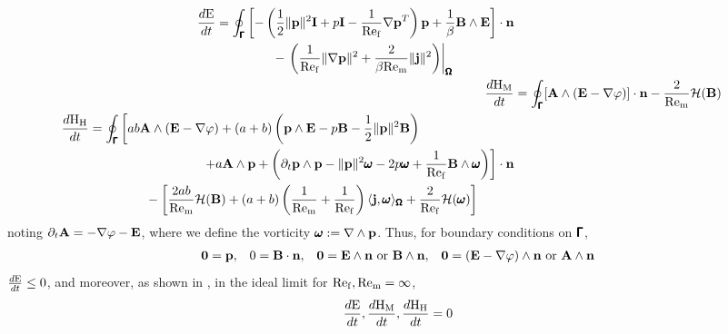     \begin{align}
        \begin{split}
            \frac{d\mathrm{E}}{dt}  &=  \oint_{\pmb{\mathsf{\Gamma}}}\left[- \left(\frac{1}{2}\|\mathbf{p}\|^{2}\mathbf{I} + p\mathbf{I} - \frac{1}{\mathrm{Re}_{\mathrm{f}}}\nabla\mathbf{p}^{T}\right)\mathbf{p} + \frac{1}{\beta}\mathbf{B}\wedge\mathbf{E}\right]\cdot\mathbf{n}  \\
            &\;\;\;\;\;\;\;\;\;\;\;\;\;\;\;\;- \left.\left(\frac{1}{\mathrm{Re}_{\mathrm{f}}}\|\nabla\mathbf{p}\|^{2} + \frac{2}{\beta\mathrm{Re}_{\mathrm{m}}}\|\mathbf{j}\|^{2}\right)\right|_{\pmb{\mathsf{\Omega}}}
        \end{split}  \\
        \frac{d\mathrm{H}_{\mathrm{M}}}{dt}  &=  \oint_{\pmb{\mathsf{\Gamma}}}[\mathbf{A}\wedge(\mathbf{E} - \nabla\varphi)]\cdot\mathbf{n} - \frac{2}{\mathrm{Re}_{\mathrm{m}}}\mathcal{H}(\mathbf{B})  \\
        \begin{split}
            \frac{d\mathrm{H}_{\mathrm{H}}}{dt}  &=  \oint_{\pmb{\mathsf{\Gamma}}}\left[ab\mathbf{A}\wedge(\mathbf{E} - \nabla\varphi) + (a + b)\left(\mathbf{p}\wedge\mathbf{E} - p\mathbf{B} - \frac{1}{2}\|\mathbf{p}\|^{2}\mathbf{B}\right)\right.  \\
            &\;\;\;\;\;\;\;\;\;\;\;\;\;\;\;\;\;\;\;\;\;\;\;\;\;\;\;\;\;\;\;\;\left.+ a\mathbf{A}\wedge\mathbf{p} + \left(\partial_{t}\mathbf{p}\wedge\mathbf{p} - \|\mathbf{p}\|^{2}\pmb{\mathsf{\omega}} - 2p\pmb{\mathsf{\omega}} + \frac{1}{\mathrm{Re}_{\mathrm{f}}}\mathbf{B}\wedge\pmb{\mathsf{\omega}}\right)\right]\cdot\mathbf{n}  \\
            &\;\;\;\;\;\;\;\;\;\;\;\;\;\;\;\;- \left[\frac{2ab}{\mathrm{Re}_{\mathrm{m}}}\mathcal{H}(\mathbf{B}) + (a + b)\left(\frac{1}{\mathrm{Re}_{\mathrm{m}}} + \frac{1}{\mathrm{Re}_{\mathrm{f}}}\right)\langle\mathbf{j}, \pmb{\mathsf{\omega}}\rangle_{\pmb{\mathsf{\Omega}}} + \frac{2}{\mathrm{Re}_{\mathrm{f}}}\mathcal{H}(\pmb{\mathsf{\omega}})\right]
        \end{split}
    \end{align}
    noting $\partial_{t}\mathbf{A}  =  - \nabla\varphi - \mathbf{E}$, where we define the vorticity $\pmb{\mathsf{\omega}}  :=  \nabla\wedge\mathbf{p}$. Thus, for boundary conditions on $\pmb{\mathsf{\Gamma}}$, 
    \begin{align}
        \mathbf{0}  =  \mathbf{p},  &&
        0  =  \mathbf{B}\cdot\mathbf{n},  &&
        \mathbf{0}  =  \mathbf{E}\wedge\mathbf{n} \text{ or } \mathbf{B}\wedge\mathbf{n},  &&
        \mathbf{0}  =  (\mathbf{E} - \nabla\varphi)\wedge\mathbf{n} \text{ or } \mathbf{A}\wedge\mathbf{n}
    \end{align}
    $\frac{d\mathrm{E}}{dt}  \leq  0$, and moreover, as shown in \cite{LHF22}, in the ideal limit for $\mathrm{Re}_{\mathrm{f}}, \mathrm{Re}_{\mathrm{m}}  =  \infty$,
    \begin{equation}
        \frac{d\mathrm{E}}{dt}, \frac{d\mathrm{H}_{\mathrm{M}}}{dt}, \frac{d\mathrm{H}_{\mathrm{H}}}{dt}  =  0
    \end{equation}


